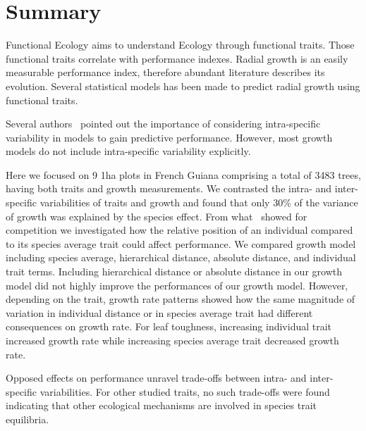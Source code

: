 \section*{Summary}

Functional Ecology aims to understand Ecology through functional traits. Those functional traits correlate with performance indexes. Radial growth is an easily measurable performance index, therefore abundant literature describes its evolution. Several statistical models has been made to predict radial growth using functional traits.

Several authors~\citep{albert_when_2011, violle_return_2012} pointed out the importance of considering intra-specific variability in models to gain predictive performance. However, most growth models do not include intra-specific variability explicitly.

Here we focused on 9 1ha plots in French Guiana comprising a total of 3483 trees, having both traits and growth measurements. We contrasted the intra- and inter-specific variabilities of traits and growth and found that only 30\% of the variance of growth was explained by the species effect. From what~\citep{kunstler_competitive_2012} showed for competition we investigated how the relative position of an individual compared to its species average trait could affect performance. We compared growth model including species average, hierarchical distance, absolute distance, and individual trait terms. Including hierarchical distance or absolute distance in our growth model did not highly improve the performances of our growth model. However, depending on the trait, growth rate patterns showed how the same magnitude of variation in individual distance or in species average trait had different consequences on growth rate. For leaf toughness, increasing individual trait increased growth rate while increasing species average trait decreased growth rate. 

Opposed effects on performance unravel trade-offs between intra- and inter-specific variabilities. For other studied traits, no such trade-offs were found indicating that other ecological mechanisms are involved in species trait equilibria.